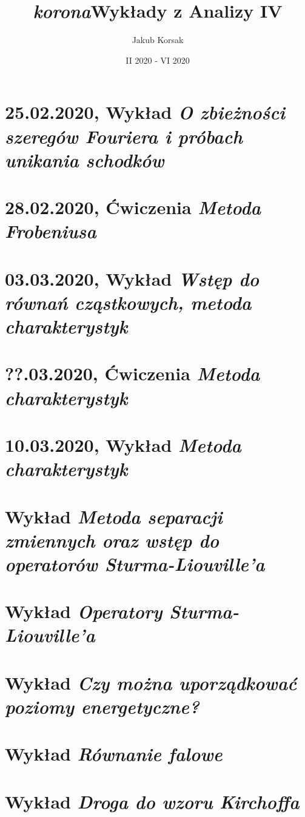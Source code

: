 \documentclass[a5paper, oneside]{memoir}
\title{\Huge \textbf{{\tiny\textit{korona}}Wykłady z Analizy IV}}
\author{Jakub Korsak}
\date{II 2020 - VI 2020}
\let\LaTeXStandardTableOfContents\tableofcontents
\renewcommand{\tableofcontents}{%
\begingroup%
\renewcommand{\bfseries}{\relax}%
\LaTeXStandardTableOfContents%
\endgroup%
}%
\begin{document}
\frontmatter
\maketitle
\pagebreak
\tableofcontents
\mainmatter
\chapter{25.02.2020, \textbf{Wykład }\textit{O zbieżności szeregów Fouriera i próbach unikania schodków}}

\chapter{28.02.2020, \textbf{Ćwiczenia }\textit{Metoda Frobeniusa}}

\chapter{03.03.2020, \textbf{Wykład }\textit{Wstęp do równań cząstkowych, metoda charakterystyk}}

\chapter{??.03.2020, \textbf{Ćwiczenia }\textit{Metoda charakterystyk}}

\chapter{10.03.2020, \textbf{Wykład }\textit{Metoda charakterystyk}}

\chapter{\textbf{Wykład }\textit{Metoda separacji zmiennych oraz wstęp do operatorów Sturma-Liouville'a}}

\chapter{\textbf{Wykład }\textit{Operatory Sturma-Liouville'a}}

\chapter{\textbf{Wykład }\textit{Czy można uporządkować poziomy energetyczne?}}

\chapter{\textbf{Wykład }\textit{Równanie falowe}}

\chapter{\textbf{Wykład }\textit{Droga do wzoru Kirchoffa}}

\end{document}
